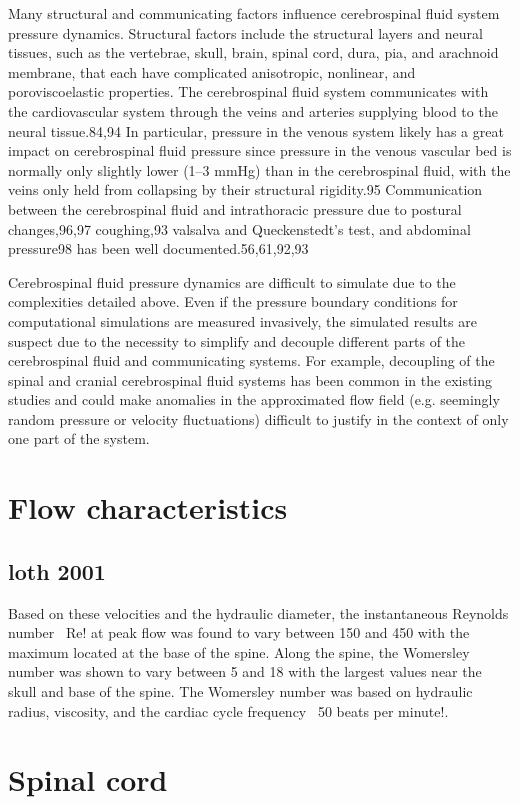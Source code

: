 \documentclass{report}
\begin{document}
Many structural and communicating factors influence
cerebrospinal fluid system pressure dynamics.
Structural factors include the structural layers and
neural tissues, such as the vertebrae, skull, brain,
spinal cord, dura, pia, and arachnoid membrane,
that each have complicated anisotropic, nonlinear,
and poroviscoelastic properties. The cerebrospinal
fluid system communicates with the cardiovascular
system through the veins and arteries supplying
blood to the neural tissue.84,94 In particular, pressure
in the venous system likely has a great impact on
cerebrospinal fluid pressure since pressure in the
venous vascular bed is normally only slightly lower
(1–3 mmHg) than in the cerebrospinal fluid, with the
veins only held from collapsing by their structural
rigidity.95 Communication between the cerebrospinal
fluid and intrathoracic pressure due to postural
changes,96,97 coughing,93 valsalva and Queckenstedt’s
test, and abdominal pressure98 has been well
documented.56,61,92,93

Cerebrospinal fluid pressure dynamics are difficult
to simulate due to the complexities detailed above.
Even if the pressure boundary conditions for computational
simulations are measured invasively, the
simulated results are suspect due to the necessity to
simplify and decouple different parts of the cerebrospinal
fluid and communicating systems. For
example, decoupling of the spinal and cranial
cerebrospinal fluid systems has been common in the
existing studies and could make anomalies in the
approximated flow field (e.g. seemingly random pressure
or velocity fluctuations) difficult to justify in the
context of only one part of the system.


\section{Flow characteristics}
\subsection{loth 2001}
Based on these velocities and the hydraulic diameter, the
instantaneous Reynolds number ~Re! at peak flow was found to
vary between 150 and 450 with the maximum located at the base
of the spine. Along the spine, the Womersley number
was shown to vary between 5 and 18 with the
largest values near the skull and base of the spine. The Womersley
number was based on hydraulic radius, viscosity, and the cardiac
cycle frequency ~50 beats per minute!.

\section{Spinal cord}
\end{document}
